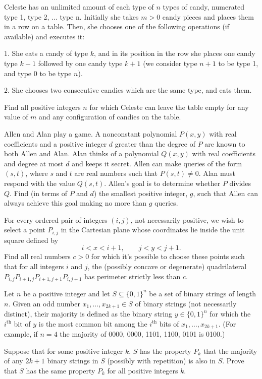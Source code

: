 \documentclass[11pt]{scrartcl}
\begin{document}
\begin{problem}[6377764165704184464]
	Celeste has an unlimited amount of each type of $n$ types of candy, numerated type 1, type 2, ... type n. Initially she takes $m>0$ candy pieces and places them in a row on a table. Then, she chooses one of the following operations (if available) and executes it:

$1.$ She eats a candy of type $k$, and in its position in the row she places one candy type $k-1$ followed by one candy type $k+1$ (we consider type $n+1$ to be type 1, and type 0 to be type $n$).

$2.$ She chooses two consecutive candies which are the same type, and eats them.

Find all positive integers $n$ for which Celeste can leave the table empty for any value of $m$ and any configuration of candies on the table.
\end{problem}
\begin{problem}[780198795852911131]
Allen and Alan play a game. A nonconstant polynomial $P(x,y)$ with real coefficients and a positive integer $d$ greater than the degree of $P$ are known to both Allen and Alan. Alan thinks of a polynomial $Q(x,y)$ with real coefficients and degree at most $d$ and keeps it secret. Allen can make queries of the form $(s,t)$, where $s$ and $t$ are real numbers such that $P(s,t)\neq0$. Alan must respond with the value $Q(s,t)$. Allen's goal is to determine whether $P$ divides $Q$. Find (in terms of $P$ and $d$) the smallest positive integer, $g$, such that Allen can always achieve this goal making no more than $g$ queries.
\end{problem}
\begin{problem}[8209367948889736949]
For every ordered pair of integers $(i,j)$, not necessarily positive, we wish to select a point $P_{i,j}$ in the Cartesian plane whose coordinates lie inside the unit square defined by
\[ i < x < i+1, \qquad j < y < j+1. \]Find all real numbers $c > 0$ for which it's possible to choose these points such that for all integers $i$ and $j$, the (possibly concave or degenerate) quadrilateral $P_{i,j} P_{i+1,j} P_{i+1,j+1} P_{i,j+1}$ has perimeter strictly less than $c$.
\end{problem}
\begin{problem}[648819281604044]
	Let $n$ be a positive integer and let $S \subseteq \{0, 1\}^n$ be a set of binary strings of length $n$. Given an odd number $x_1, \dots, x_{2k + 1} \in S$ of binary strings (not necessarily distinct), their majority is defined as the binary string $y \in \{0, 1\}^n$ for which the $i^{\text{th}}$ bit of $y$ is the most common bit among the $i^{\text{th}}$ bits of $x_1, \dots,x_{2k + 1}$. (For example, if $n = 4$ the majority of 0000, 0000, 1101, 1100, 0101 is 0100.)

Suppose that for some positive integer $k$, $S$ has the property $P_k$ that the majority of any $2k + 1$ binary strings in $S$ (possibly with repetition) is also in $S$. Prove that $S$ has the same property $P_k$ for all positive integers $k$.
\end{problem}
\end{document}
